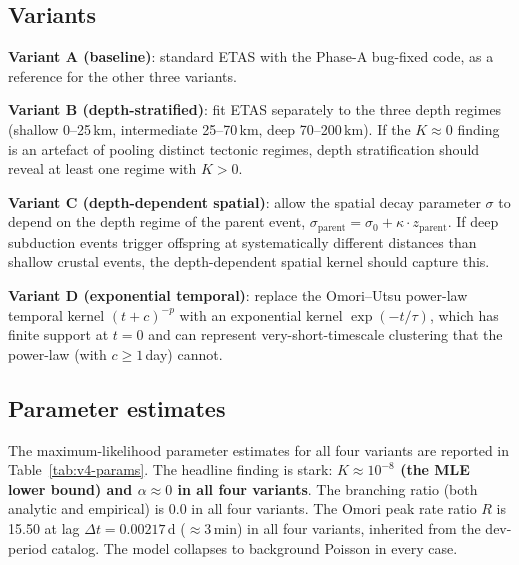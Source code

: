 \documentclass[10pt,a4paper,twocolumn]{article}
\begin{document}
\subsection{Variants}

\textbf{Variant A (baseline)}: standard ETAS with the Phase-A bug-fixed code, as a reference for the other three variants.

\textbf{Variant B (depth-stratified)}: fit ETAS separately to the three depth regimes (shallow 0--25\,km, intermediate 25--70\,km, deep 70--200\,km). If the $K\approx0$ finding is an artefact of pooling distinct tectonic regimes, depth stratification should reveal at least one regime with $K>0$.

\textbf{Variant C (depth-dependent spatial)}: allow the spatial decay parameter $\sigma$ to depend on the depth regime of the parent event, $\sigma_{\text{parent}} = \sigma_0 + \kappa \cdot z_{\text{parent}}$. If deep subduction events trigger offspring at systematically different distances than shallow crustal events, the depth-dependent spatial kernel should capture this.

\textbf{Variant D (exponential temporal)}: replace the Omori--Utsu power-law temporal kernel $(t+c)^{-p}$ with an exponential kernel $\exp(-t/\tau)$, which has finite support at $t=0$ and can represent very-short-timescale clustering that the power-law (with $c\geq1$\,day) cannot.

\subsection{Parameter estimates}

The maximum-likelihood parameter estimates for all four variants are reported in Table~\ref{tab:v4-params}. The headline finding is stark: \textbf{$K\approx10^{-8}$ (the MLE lower bound) and $\alpha\approx0$ in all four variants}. The branching ratio (both analytic and empirical) is 0.0 in all four variants. The Omori peak rate ratio $R$ is 15.50 at lag $\Delta t = 0.00217$\,d ($\approx3$\,min) in all four variants, inherited from the dev-period catalog. The model collapses to background Poisson in every case.
\end{document}
